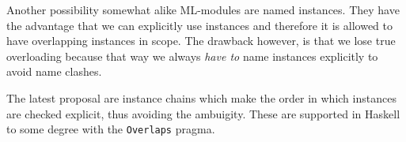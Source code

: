 Another possibility somewhat alike ML-modules are named instances.
They have the advantage that we can explicitly use instances and therefore it is allowed to have overlapping instances in scope.
The drawback however, is that we lose true overloading because that way we always \emph{have to} name instances explicitly to avoid name clashes.

The latest proposal are instance chains which make the order in which instances are checked explicit, thus avoiding the ambuigity. \cite{morris2010instance}
These are supported in Haskell to some degree with the \texttt{Overlaps} pragma.
